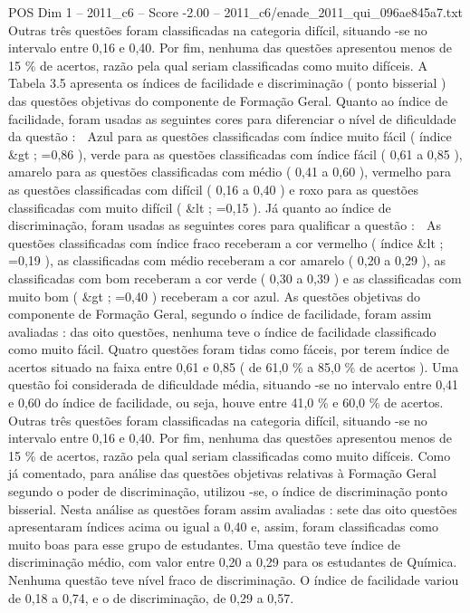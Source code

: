 \begin{textsample}{POS Dim 1 – 2011\_c6 – Score -2.00 – 2011\_c6/enade\_2011\_qui\_096ae845a7.txt}
Outras três questões foram classificadas na categoria difícil, situando -se no intervalo entre 0,16 e 0,40.
Por fim, nenhuma das questões apresentou menos de 15 \% de acertos, razão pela qual seriam classificadas como muito difíceis.
A Tabela 3.5 apresenta os índices de facilidade e discriminação ( ponto bisserial ) das questões objetivas do componente de Formação Geral.
Quanto ao índice de facilidade, foram usadas as seguintes cores para diferenciar o nível de dificuldade da questão :  Azul para as questões classificadas com índice muito fácil ( índice \&gt ; =0,86 ), verde para as questões classificadas com índice fácil ( 0,61 a 0,85 ), amarelo para as questões classificadas com médio ( 0,41 a 0,60 ), vermelho para as questões classificadas com difícil ( 0,16 a 0,40 ) e roxo para as questões classificadas com muito difícil ( \&lt ; =0,15 ).
Já quanto ao índice de discriminação, foram usadas as seguintes cores para qualificar a questão :  As questões classificadas com índice fraco receberam a cor vermelho ( índice \&lt ; =0,19 ), as classificadas com médio receberam a cor amarelo ( 0,20 a 0,29 ), as classificadas com bom receberam a cor verde ( 0,30 a 0,39 ) e as classificadas com muito bom ( \&gt ; =0,40 ) receberam a cor azul.
As questões objetivas do componente de Formação Geral, segundo o índice de facilidade, foram assim avaliadas : das oito questões, nenhuma teve o índice de facilidade classificado como muito fácil.
Quatro questões foram tidas como fáceis, por terem índice de acertos situado na faixa entre 0,61 e 0,85 ( de 61,0 \% a 85,0 \% de acertos ).
Uma questão foi considerada de dificuldade média, situando -se no intervalo entre 0,41 e 0,60 do índice de facilidade, ou seja, houve entre 41,0 \% e 60,0 \% de acertos.
Outras três questões foram classificadas na categoria difícil, situando -se no intervalo entre 0,16 e 0,40.
Por fim, nenhuma das questões apresentou menos de 15 \% de acertos, razão pela qual seriam classificadas como muito difíceis.
Como já comentado, para análise das questões objetivas relativas à Formação Geral segundo o poder de discriminação, utilizou -se, o índice de discriminação ponto bisserial.
Nesta análise as questões foram assim avaliadas : sete das oito questões apresentaram índices acima ou igual a 0,40 e, assim, foram classificadas como muito boas para esse grupo de estudantes.
Uma questão teve índice de discriminação médio, com valor entre 0,20 a 0,29 para os estudantes de Química.
Nenhuma questão teve nível fraco de discriminação.
O índice de facilidade variou de 0,18 a 0,74, e o de discriminação, de 0,29 a 0,57.

\end{textsample}

